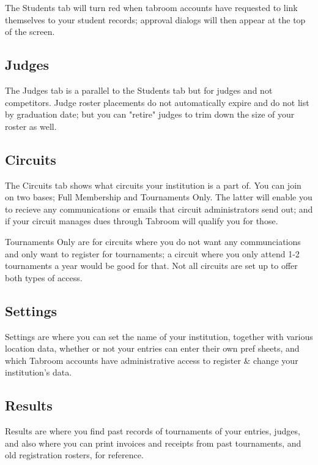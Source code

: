 \documentclass[12pt]{report}
\begin{document}
		The Students tab will turn red when tabroom accounts have requested to
		link themselves to your student records; approval dialogs will then
		appear at the top of the screen.

	\subsection{Judges}

		The Judges tab is a parallel to the Students tab but for judges and not
		competitors.  Judge roster placements do not automatically expire and
		do not list by graduation date; but you can "retire" judges to trim
		down the size of your roster as well.

	\subsection{Circuits}

		The Circuits tab shows what circuits your institution is a part of.
		You can join on two bases; Full Membership and Tournaments Only.  The
		latter will enable you to recieve any communications or emails that
		circuit administrators send out; and if your circuit manages dues
		through Tabroom will qualify you for those.

		Tournaments Only are for circuits where you do not want any
		communciations and only want to register for tournaments; a circuit
		where you only attend 1-2 tournaments a year would be good for that.
		Not all circuits are set up to offer both types of access.

	\subsection{Settings}

		Settings are where you can set the name of your institution, together
		with various location data, whether or not your entries can enter their
		own pref sheets, and which Tabroom accounts have administrative access
		to register \& change your institution's data.

	\subsection{Results}

		Results are where you find past records of tournaments of your entries,
		judges, and also where you can print invoices and receipts from past
		tournaments, and old registration rosters, for reference.
\end{document}
